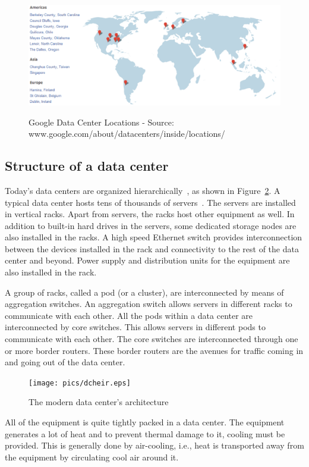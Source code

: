 \begin{figure}
\includegraphics[width=1\textwidth]{pics/googledcmap2.eps}
\label{fig:googledcmap}
\caption{Google Data Center Locations - Source: www.google.com/about/datacenters/inside/locations/}
\end{figure}

\subsection{Structure of a data center} Today's data centers are organized hierarchically~\cite{dcnetworking:vahdat:micro:2010}, as shown in Figure~\ref{fig:dcheir}. A typical data center hosts tens of thousands of servers~\cite{Abts:2012:GTD:2184319.2184335}. The servers are installed in vertical racks. Apart from servers, the racks host other equipment as well. In addition to built-in hard drives in the servers, some dedicated storage nodes are also installed in the racks. A high speed Ethernet switch provides interconnection between the devices installed in the rack and connectivity to the rest of the data center and beyond. Power supply and distribution units for the equipment are also installed in the rack. 

A group of racks, called a pod (or a cluster), are interconnected by means of aggregation switches. An aggregation switch allows servers in different racks to communicate with each other. All the pods within a data center are interconnected by core switches. This allows servers in different pods to communicate with each other. The core switches are interconnected through one or more border routers. These border routers are the avenues for traffic coming in and going out of the data center. 

\begin{figure}
\texttt{[image: pics/dcheir.eps]}
\caption{The modern data center's architecture}
\label{fig:dcheir}
\end{figure}

All of the equipment is quite tightly packed in a data center. The equipment generates a lot of heat and to prevent thermal damage to it, cooling must be provided. This is generally done by air-cooling, i.e., heat is transported away from the equipment by circulating cool air around it.

